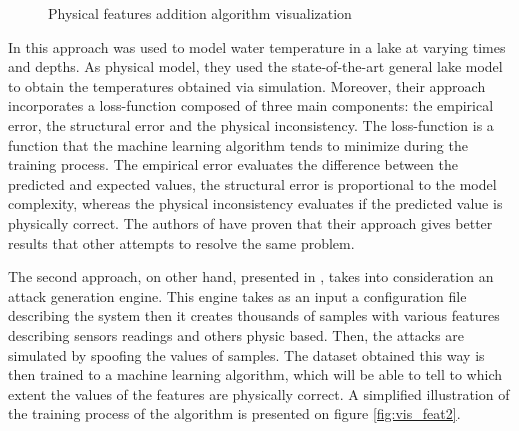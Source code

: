 \begin{figure}[H]
    \centering
    \caption{Physical features addition algorithm visualization} \label{fig:vis_feat1}
\end{figure}

In \cite{karpatne_physics-guided_2018} this approach was used to model water temperature in a lake at varying times and depths. As physical model, they used the state-of-the-art general lake model \cite{hipsey_glm_2014} to obtain the temperatures obtained via simulation. Moreover, their approach incorporates a loss-function composed of three main components: the empirical error, the structural error and the physical inconsistency. The loss-function is a function that the machine learning algorithm tends to minimize during the training process. The empirical error evaluates the difference between the predicted and expected values, the structural error is proportional to the model complexity, whereas the physical inconsistency evaluates if the predicted value is physically correct. The authors of \cite{karpatne_physics-guided_2018} have proven that their approach gives better results that other attempts to resolve the same problem.

The second approach, on other hand, presented in \cite{ferragut_real-time_2017}, takes into consideration an attack generation engine. This engine takes as an input a configuration file describing the system then it creates thousands of samples with various features describing sensors readings and others physic based. Then, the attacks are simulated by spoofing the values of samples. The dataset obtained this way is then trained to a machine learning algorithm, which will be able to tell to which extent the values of the features are physically correct. A simplified illustration of the training process of the algorithm is presented on figure \ref{fig:vis_feat2}.

